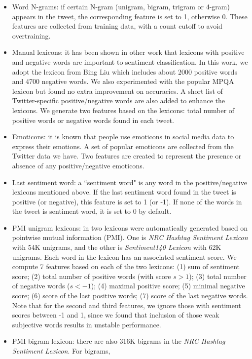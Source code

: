 \documentclass[11pt]{article}
\begin{document}
\begin{itemize}
\item Word N-grams: if certain N-gram (unigram, bigram, trigram or 4-gram) appears in the tweet, the corresponding
feature is set to 1, otherwise 0. These features are collected from training data, with a count cutoff to
avoid overtraining.
\item Manual lexicons: it has been shown in other work \cite{SemEval:13} that lexicons with positive and negative words
are important to sentiment classification. In this work, we adopt the lexicon from Bing Liu \cite{Liu:04} which includes
about 2000 positive words and 4700 negative words. We also experimented with the popular MPQA \cite{Wilson:05} lexicon but
found no extra improvement on accuracies. A short list of Twitter-specific positive/negative words are also added to enhance
the lexicons. We generate two features based on the lexicons: total number of positive words or
negative words found in each tweet.
\item Emoticons: it is known that people use emoticons in social media data to express their
emotions. A set of popular emoticons are collected from the Twitter data we have. Two features are created to
represent the presence or absence of any positive/negative emoticons.
\item Last sentiment word: a ``sentiment word" is any word in the positive/negative lexicons mentioned
above. If the last sentiment word found in the tweet is positive (or negative), this feature is set to 1 (or -1). If
none of the words in the tweet is sentiment word, it is set to 0 by default.
\item PMI unigram lexicons: in \cite{Mohammad:13} two lexicons were automatically generated based on pointwise mutual 
information (PMI). One is \textit{NRC Hashtag Sentiment Lexicon} with 54K unigrams, and the other is
\textit{Sentiment140 Lexicon} with 62K unigrams. Each word in the lexicon has an associated sentiment score.
We compute 7 features based on each of the two lexicons: (1) sum of sentiment score;
(2) total number of positive words (with score $s>1$); (3) total number of negative words ($s<-1$);
(4) maximal positive score; (5) minimal negative score; (6) score of the last positive words; 
(7) score of the last negative words.
Note that for the second and third features, we ignore those
with sentiment scores between -1 and 1, since we found that inclusion of those weak subjective words results in
unstable performance.
\item PMI bigram lexicon: there are also 316K bigrams in the \textit{NRC Hashtag Sentiment Lexicon}. For bigrams,

\end{itemize}
\end{document}
